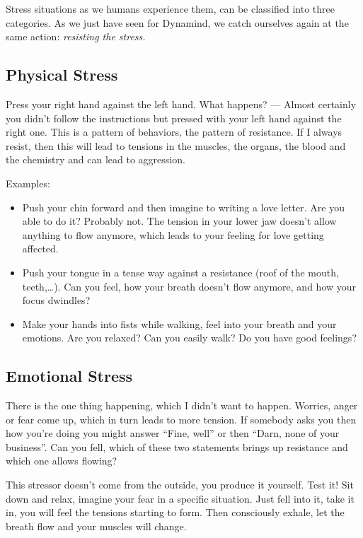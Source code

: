 \documentclass[../main.tex]{subfiles}
\begin{document}
Stress situations as we humans experience them, can be classified into three categories.
As we just have seen for Dynamind, we catch ourselves again at the same action: \emph{resisting the stress.}

\subsection{Physical Stress}
Press your right hand against the left hand. What happens? ---
Almost certainly you didn't follow the instructions but pressed with your left hand against the right one.
This is a pattern of behaviors, the pattern of resistance.
If I always resist, then this will lead to tensions in the muscles, the organs, the blood and the chemistry and can lead to aggression.

Examples:
\begin{itemize}
\item Push your chin forward and then imagine to writing a love letter. Are you able to do it? Probably not.
  The tension in your lower jaw doesn't allow anything to flow anymore, which leads to your feeling for love getting affected.
\item Push your tongue in a tense way against a resistance (roof of the mouth, teeth,\ldots).
    Can you feel, how your breath doesn't flow anymore, and how your focus dwindles?
  \item Make your hands into fists while walking, feel into your breath and your emotions. Are you relaxed?
    Can you easily walk? Do you have good feelings?
  \end{itemize}

  \subsection{Emotional  Stress}

  There is the one thing happening, which I didn't want to happen.
  Worries, anger or fear come up, which in turn leads to more tension.
  If somebody asks you then how you're doing you might answer ``Fine, well'' or then ``Darn, none of your business''.
  Can you fell, which of these two statements brings up resistance and which one allows flowing?

  This stressor doesn't come from the outside, you produce it yourself.
  Test it!
  Sit down and relax, imagine your fear in a specific situation.
  Just fell into it, take it in, you will feel the tensions starting to form.
  Then consciously exhale, let the breath flow and your muscles will change.
\end{document}
